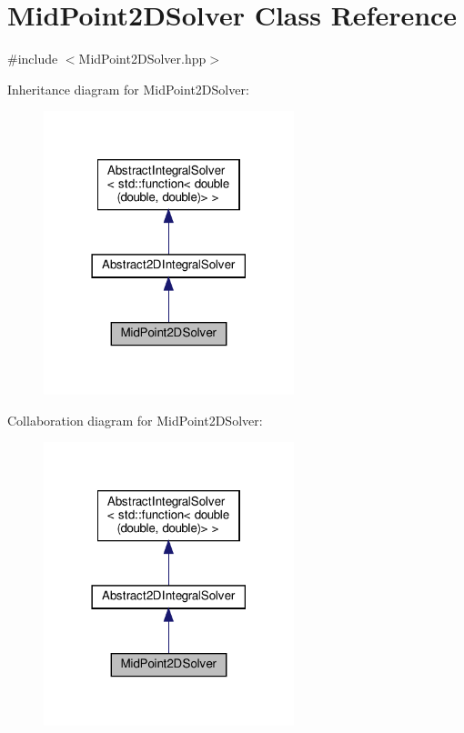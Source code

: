 \hypertarget{class_mid_point2_d_solver}{}\section{Mid\+Point2\+D\+Solver Class Reference}
\label{class_mid_point2_d_solver}


{\ttfamily \#include $<$Mid\+Point2\+D\+Solver.\+hpp$>$}



Inheritance diagram for Mid\+Point2\+D\+Solver\+:\nopagebreak
\begin{figure}[H]
\begin{center}
\leavevmode
\includegraphics[width=206pt]{class_mid_point2_d_solver__inherit__graph}
\end{center}
\end{figure}


Collaboration diagram for Mid\+Point2\+D\+Solver\+:\nopagebreak
\begin{figure}[H]
\begin{center}
\leavevmode
\includegraphics[width=206pt]{class_mid_point2_d_solver__coll__graph}
\end{center}
\end{figure}
